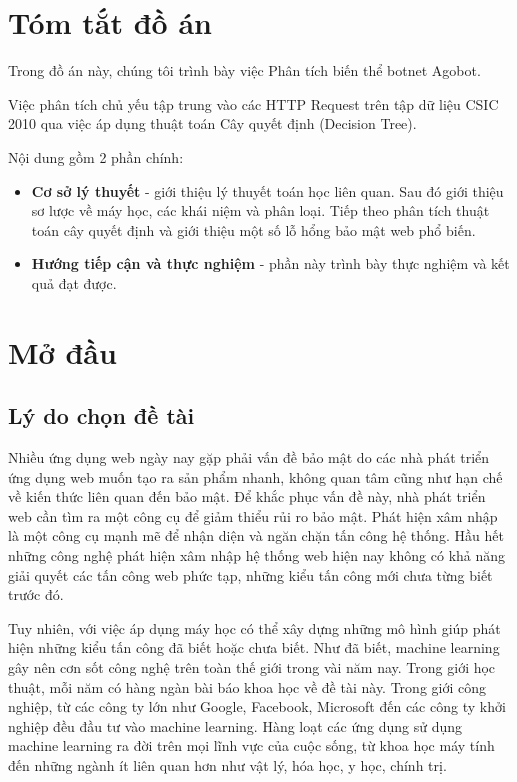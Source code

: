 
\chapter*{Tóm tắt đồ án}

Trong đồ án này, chúng tôi trình bày việc Phân tích biến thể botnet Agobot.

Việc phân tích chủ yếu tập trung vào các HTTP Request trên tập dữ liệu CSIC 2010 qua việc áp dụng thuật toán Cây quyết định (Decision Tree).

Nội dung gồm 2 phần chính:

\begin{itemize}
  \item \textbf{Cơ sở lý thuyết} - giới thiệu lý thuyết toán học liên quan. Sau đó giới thiệu sơ lược về máy học, các khái niệm và phân loại. Tiếp theo phân tích thuật toán cây quyết định và giới thiệu một số lỗ hổng bảo mật web phổ biến.

  \item \textbf{Hướng tiếp cận và thực nghiệm} - phần này trình bày thực nghiệm và kết quả đạt được.
\end{itemize}

\newpage

\chapter*{Mở đầu}

\section*{Lý do chọn đề tài}
Nhiều ứng dụng web ngày nay gặp phải vấn đề bảo mật do các nhà phát triển ứng dụng web muốn tạo ra sản phẩm nhanh, không quan tâm cũng như hạn chế về kiến thức liên quan đến bảo mật. Để khắc phục vấn đề này, nhà phát triển web cần tìm ra một công cụ để giảm thiểu rủi ro bảo mật. Phát hiện xâm nhập là một công cụ mạnh mẽ để nhận diện và ngăn chặn tấn công hệ thống. Hầu hết những công nghệ phát hiện xâm nhập hệ thống web hiện nay không có khả năng giải quyết các tấn công web phức tạp, những kiểu tấn công mới chưa từng biết trước đó.

Tuy nhiên, với việc áp dụng máy học có thể xây dựng những mô hình giúp phát hiện những kiểu tấn công đã biết hoặc chưa biết. Như đã biết, machine learning gây nên cơn sốt công nghệ trên toàn thế giới trong vài năm nay. Trong giới học thuật, mỗi năm có hàng ngàn bài báo khoa học về đề tài này. Trong giới công nghiệp, từ các công ty lớn như Google, Facebook, Microsoft đến các công ty khởi nghiệp đều đầu tư vào machine learning. Hàng loạt các ứng dụng sử dụng machine learning ra đời trên mọi lĩnh vực của cuộc sống, từ khoa học máy tính đến những ngành ít liên quan hơn như vật lý, hóa học, y học, chính trị.

